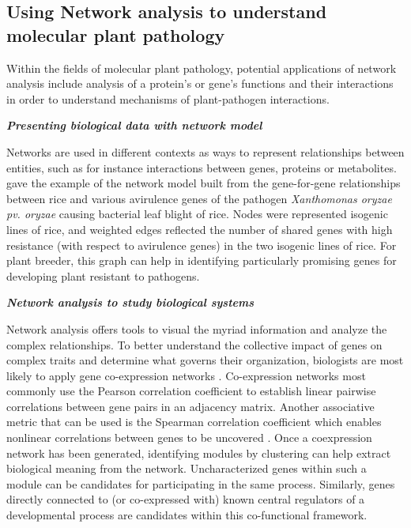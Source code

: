 \subsection*{Using Network analysis to understand molecular plant pathology}
Within the fields of molecular plant pathology, potential applications of network analysis include analysis of a protein’s or gene’s functions and their interactions in order to understand mechanisms of plant-pathogen interactions.

\textit{\textbf{Presenting biological data with network model}}

Networks are used in different contexts as ways to represent relationships between entities, such as for instance interactions between genes, proteins or metabolites.  gave the example of the network model built from the gene-for-gene relationships between rice and various avirulence genes of the pathogen \textit{Xanthomonas oryzae pv. oryzae} causing bacterial leaf blight of rice. Nodes were represented isogenic lines of rice, and weighted edges reflected the number of shared genes with high resistance (with respect to avirulence genes) in the two isogenic lines of rice. For plant breeder, this graph can help in identifying particularly promising genes for developing plant resistant to pathogens. 

\textit{\textbf{Network analysis to study biological systems}}

Network analysis offers tools to visual the myriad information and analyze the complex relationships. 
To better understand the collective impact of genes on complex traits and determine what governs their organization, biologists are most likely to apply gene co-expression networks . Co-expression networks most commonly use the Pearson correlation coefficient to establish linear pairwise correlations between gene pairs in an adjacency matrix. Another associative metric that can be used is the Spearman correlation coefficient which enables nonlinear correlations between genes to be uncovered . Once a coexpression network has been generated, identifying modules by clustering can help extract biological meaning from the network. Uncharacterized genes within such a module can be candidates for participating in the same process. Similarly, genes directly connected to (or co-expressed with) known central regulators of a developmental process are candidates within this co-functional framework.


